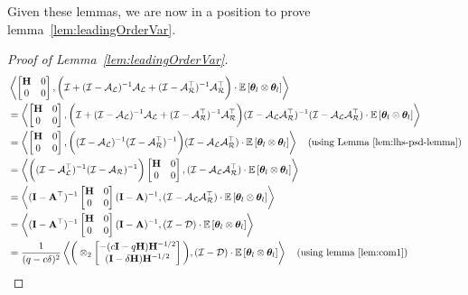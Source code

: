 Given these lemmas, we are now in a position to prove lemma~\ref{lem:leadingOrderVar}.
\begin{proof}[Proof of Lemma~\ref{lem:leadingOrderVar}]

\begin{align}
\label{eq:simpVarMain}
&\iprod{\begin{bmatrix}\H&0\\0&0\end{bmatrix}}{\bigg(\eyeT+(\eyeT-\AL)^{-1}\AL+(\eyeT-\AR\T)^{-1}\AR\T\bigg)
\cdot\E{\thetav_{l}\otimes\thetav_{l}}}\nonumber\\
&=\iprod{\begin{bmatrix}\H&0\\0&0\end{bmatrix}}{\bigg(\eyeT+(\eyeT-\AL)^{-1}\AL+(\eyeT-\AR\T)^{-1}\AR\T\bigg)(\eyeT-\AL\AR\T)^{-1}(\eyeT-\AL\AR\T)\cdot\E{\thetav_{l}\otimes\thetav_{l}}}\nonumber\\
&=\iprod{\begin{bmatrix}\H&0\\0&0\end{bmatrix}}{\bigg((\eyeT-\AL)^{-1}(\eyeT-\AR\T)^{-1}\bigg)(\eyeT-\AL\AR\T)\cdot\E{\thetav_{l}\otimes\thetav_{l}}}\quad \left(\mbox{using Lemma~\ref{lem:lhs-psd-lemma}}\right)\nonumber\\
&=\iprod{\bigg((\eyeT-\AL\T)^{-1}(\eyeT-\AR)^{-1}\bigg)\begin{bmatrix}\H&0\\0&0\end{bmatrix}}{(\eyeT-\AL\AR\T)\cdot\E{\thetav_{l}\otimes\thetav_{l}}}\nonumber\\
&=\iprod{(\eye-\A\T)^{-1}\begin{bmatrix}\H&0\\0&0\end{bmatrix}(\eye-\A)^{-1}}{(\eyeT-\AL\AR\T)\cdot\E{\thetav_{l}\otimes\thetav_{l}}}\nonumber\\
&=\iprod{(\eye-\A\T)^{-1}\begin{bmatrix}\H&0\\0&0\end{bmatrix}(\eye-\A)^{-1}}{(\eyeT-\DT)\cdot\E{\thetav_{l}\otimes\thetav_{l}}}\nonumber\\
&=\frac{1}{(\g -c\delta)^2}\iprod{\bigg(\otimes_2\begin{bmatrix} -(c\eye-\g \Cov)\Cov^{-1/2}\\(\eye-\delta\Cov)\Cov^{-1/2}\end{bmatrix}\bigg)}{(\eyeT-\DT)\cdot\E{\thetav_l\otimes\thetav_l}}\quad\text{(using lemma~\ref{lem:com1})}\nonumber\\

\end{align}
\end{proof}
